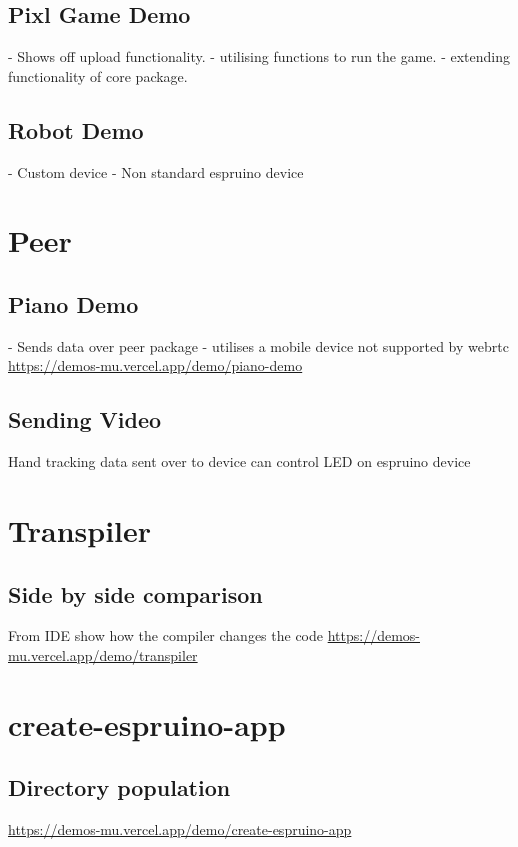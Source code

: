 \documentclass{l4proj}
\begin{document}
\begin{appendices}
\subsection{Pixl Game Demo}
- Shows off upload functionality.
- utilising functions to run the game.
- extending functionality of core package.

\subsection{Robot Demo}
- Custom device
- Non standard espruino device

\section{Peer}

\subsection{Piano Demo}
- Sends data over peer package
- utilises a mobile device not supported by webrtc
\href{https://demos-mu.vercel.app/demo/piano-demo}{https://demos-mu.vercel.app/demo/piano-demo}

\subsection{Sending Video}
Hand tracking data sent over to device can control LED on espruino device

\section{Transpiler}

\subsection{Side by side comparison}
From IDE show how the compiler changes the code
\href{https://demos-mu.vercel.app/demo/transpiler}{https://demos-mu.vercel.app/demo/transpiler}

\section{create-espruino-app}

\subsection{Directory population}
\href{https://demos-mu.vercel.app/demo/create-espruino-app}{https://demos-mu.vercel.app/demo/create-espruino-app}


\end{appendices}
\end{document}
